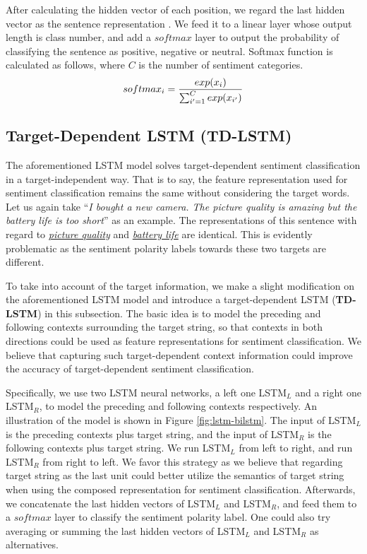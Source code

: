 \documentclass[11pt]{article}
\begin{document}
After calculating the hidden vector of each position, we regard the last hidden vector as the sentence representation \cite{Li2015a,Tang2015}.
We feed it to a linear layer whose output length is class number, and add a $softmax$ layer to output the probability of classifying the sentence as positive, negative or neutral. 
Softmax function is calculated as follows, where $C$ is the number of sentiment categories. 
\begin{equation}\label{equa:softmax}
\centering
softmax_i =\frac{exp(x_i)}{\sum_{i'=1}^Cexp(x_{i'})}
\end{equation}

\subsection{Target-Dependent LSTM (TD-LSTM)}
The aforementioned LSTM model solves target-dependent sentiment classification in a target-independent way. 
That is to say, the feature representation used for sentiment classification remains the same without considering the target words. 
Let us again take ``\textit{I bought a new camera. The {picture quality} is amazing but the {battery life} is too short}'' as an example.
The representations of this sentence with regard to \textit{\underline{picture quality}} and \textit{\underline{battery life}} are identical. This is evidently problematic as the sentiment polarity labels towards these two targets are different.

To take into account of the target information, we make a slight modification on the aforementioned LSTM model and introduce a target-dependent LSTM (\textbf{TD-LSTM}) in this subsection.
The basic idea is to model the preceding and following contexts surrounding the target string, so that contexts in both directions could be used as feature representations for sentiment classification. We believe that capturing such target-dependent context information could improve the accuracy of target-dependent sentiment classification. 

Specifically, we use two LSTM neural networks, a left one LSTM$_L$ and a right one LSTM$_R$, to model the preceding and following contexts respectively. An illustration of the model is shown in Figure \ref{fig:lstm-bilstm}.
The input of LSTM$_L$ is the preceding contexts plus target string, and the input of LSTM$_R$ is the following contexts plus target 
string.
We run LSTM$_L$ from left to right, and run LSTM$_R$ from right to left.
We favor this strategy as we believe that regarding target string as the last unit could better utilize the semantics of target string when using the composed representation for sentiment classification.
Afterwards, we concatenate the last hidden vectors of LSTM$_L$ and LSTM$_R$, and feed them to a $softmax$ layer to classify the sentiment polarity label.
One could also try averaging or summing the last hidden vectors of LSTM$_L$ and LSTM$_R$ as alternatives.
\end{document}
